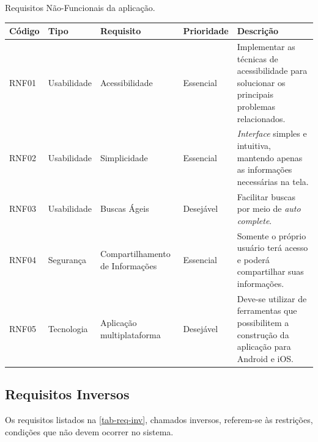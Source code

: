 \begin{quadro}[htb]
    \begin{center}
        \ABNTEXfontereduzida
        \caption{Requisitos Não-Funcionais da aplicação.}
        \label{tab-req-nf}
        \begin{tabular}{p{1.1cm}|p{1.6cm}|p{3.0cm}|p{1.5cm}|p{6.7cm}}
            \textbf{Código} & \textbf{Tipo} & \textbf{Requisito}              & \textbf{Prioridade} & \textbf{Descrição} \\
            \hline
            RNF01           & Usabilidade   & Acessibilidade                  & Essencial           &
            Implementar as técnicas de acessibilidade para solucionar os principais problemas relacionados.              \\
            \hline
            RNF02           & Usabilidade   & Simplicidade                    & Essencial           &
            \emph{Interface} simples e intuitiva, mantendo apenas as informações necessárias na tela.                    \\
            \hline
            RNF03           & Usabilidade   & Buscas Ágeis                    & Desejável           &
            Facilitar buscas por meio de \emph{auto complete}.                                                           \\
            \hline
            RNF04           & Segurança     & Compartilhamento de Informações & Essencial           &
            Somente o próprio usuário terá acesso e poderá compartilhar suas informações.                                \\
            \hline
            RNF05           & Tecnologia    & Aplicação multiplataforma       & Desejável           &
            Deve-se utilizar de ferramentas que possibilitem a construção da aplicação para Android e iOS\@.             \\
        \end{tabular}
    \end{center}
\end{quadro}

\subsection{Requisitos Inversos}

Os requisitos listados na \autoref{tab-req-inv}, chamados inversos, referem-se às restrições, condições que não devem ocorrer no sistema.

